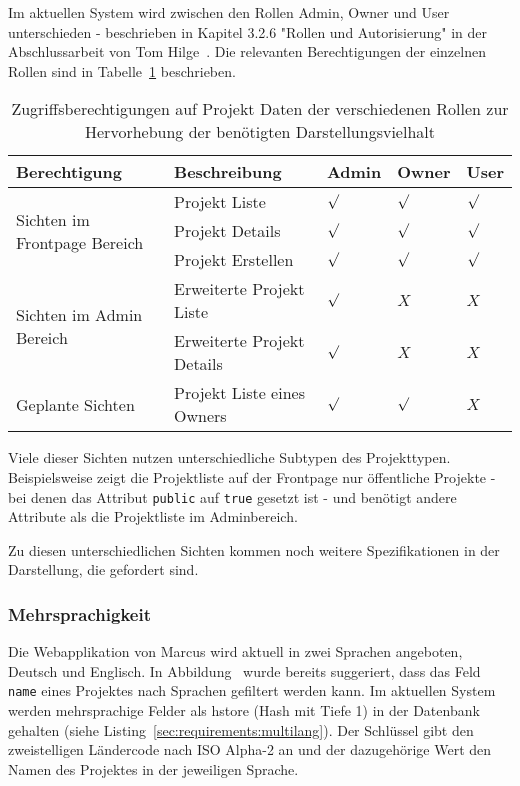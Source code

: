 Im aktuellen System wird zwischen den Rollen Admin, Owner und User unterschieden - beschrieben in Kapitel 3.2.6 "Rollen und Autorisierung"
in der Abschlussarbeit von Tom Hilge~\cite{Abschlussarbeit-Tom-Hilge}.
Die relevanten Berechtigungen der einzelnen Rollen sind in Tabelle~\ref{tbl:req:roles} beschrieben.

\begin{table}[h!]
    \begin{tabular}{|p{}|p{}|p{}|p{}|p{}|}
        \hline
        \textbf{Berechtigung} & \textbf{Beschreibung} & \textbf{Admin} & \textbf{Owner} & \textbf{User} \\ \hline
        \multirow{3}{*}{Sichten im Frontpage Bereich}
        & Projekt Liste & $\surd$ & $\surd$ & $\surd$\\
        & Projekt Details & $\surd$ & $\surd$ & $\surd$\\
        & Projekt Erstellen & $\surd$ & $\surd$ & $\surd$ \\
        \hline
        \multirow{2}{*}{Sichten im Admin Bereich}
        & Erweiterte Projekt Liste & $\surd$ & $X$ & $X$\\
        & Erweiterte Projekt Details & $\surd$ & $X$ & $X$\\
        \hline
        \multirow{1}{*}{Geplante Sichten}
        & Projekt Liste eines Owners & $\surd$ & $\surd$ & $X$\\
        \hline
    \end{tabular}
    \vspace{5pt}
    \caption{Zugriffsberechtigungen auf Projekt Daten der verschiedenen Rollen zur Hervorhebung der benötigten Darstellungsvielhalt}
    \label{tbl:req:roles}
\end{table}

Viele dieser Sichten nutzen unterschiedliche Subtypen des Projekttypen.
Beispielsweise zeigt die Projektliste auf der Frontpage nur öffentliche Projekte - bei denen das Attribut \texttt{public} auf \texttt{true} gesetzt ist  -
und benötigt andere Attribute als die Projektliste im Adminbereich. 

Zu diesen unterschiedlichen Sichten kommen noch weitere Spezifikationen in der Darstellung, die gefordert sind.

\subsubsection{Mehrsprachigkeit}
Die Webapplikation von Marcus wird aktuell in zwei Sprachen angeboten, Deutsch und Englisch.
In Abbildung~ wurde bereits suggeriert, dass das Feld \texttt{name} eines Projektes nach Sprachen gefiltert werden kann.
Im aktuellen System werden mehrsprachige Felder
als hstore (Hash mit Tiefe 1) in der Datenbank gehalten (siehe Listing~\ref{sec:requirements:multilang}). Der Schlüssel gibt den zweistelligen Ländercode nach ISO Alpha-2 \cite{iso-alpha-2} an
und der dazugehörige Wert den Namen des Projektes in der jeweiligen Sprache.

